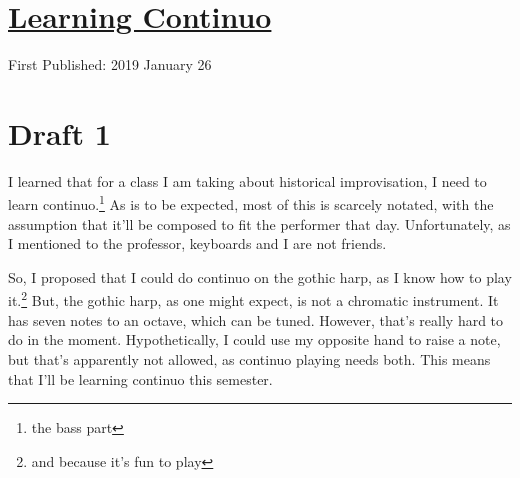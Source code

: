\documentclass[12pt]{article}[titlepage]
\newcommand{\1}{\={a}}
\newcommand{\2}{\={e}}
\newcommand{\3}{\={\i}}
\newcommand{\4}{\=o}
\newcommand{\5}{\=u}
\newcommand{\6}{\={A}}
\renewcommand{\,}{\textsuperscript{,}}
\begin{document}
\doublespacing
\section{\href{learning-continuo.html}{Learning Continuo}}
First Published: 2019 January 26
\section{Draft 1}
I learned that for a class I am taking about historical improvisation, I need to learn continuo.\footnote{the bass part}
As is to be expected, most of this is scarcely notated, with the assumption that it'll be composed to fit the performer that day.
Unfortunately, as I mentioned to the professor, keyboards and I are not friends.

So, I proposed that I could do continuo on the gothic harp, as I know how to play it.\footnote{and because it's fun to play}
But, the gothic harp, as one might expect, is not a chromatic instrument.
It has seven notes to an octave, which can be tuned.
However, that's really hard to do in the moment.
Hypothetically, I could use my opposite hand to raise a note, but that's apparently not allowed, as continuo playing needs both.
This means that I'll be learning continuo this semester.
\end{document}

